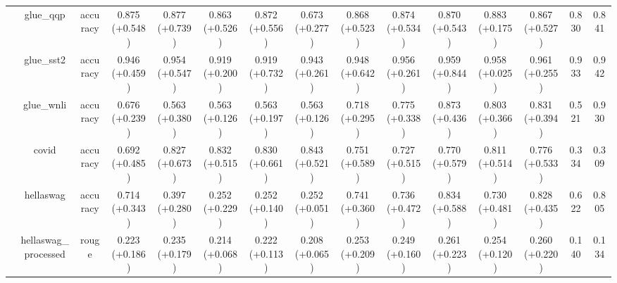 \begin{landscape}
\begin{table}[ht]
{\begin{tabular}{ccccccccccccccc}
                                   & glue\_qqp                      & accuracy                         & 0.875 (+0.548)     & 0.877 (+0.739)    & 0.863 (+0.526)             & 0.872 (+0.556)    & 0.673 (+0.277)             & 0.868 (+0.523)      & 0.874 (+0.534)           & 0.870 (+0.543)      & 0.883 (+0.175)               & 0.867 (+0.527)          & 0.830                  & 0.841          \\
                                   & glue\_sst2                     & accuracy                         & 0.946 (+0.459)     & 0.954 (+0.547)    & 0.919 (+0.200)             & 0.919 (+0.732)    & 0.943 (+0.261)             & 0.948 (+0.642)      & 0.956 (+0.261)           & 0.959 (+0.844)      & 0.958 (+0.025)               & 0.961 (+0.255)          & 0.933                  & 0.942          \\
                                   & glue\_wnli                     & accuracy                         & 0.676 (+0.239)     & 0.563 (+0.380)    & 0.563 (+0.126)             & 0.563 (+0.197)    & 0.563 (+0.126)             & 0.718 (+0.295)      & 0.775 (+0.338)           & 0.873 (+0.436)      & 0.803 (+0.366)               & 0.831 (+0.394)          & 0.521                  & 0.930          \\
                                   & covid                          & accuracy                         & 0.692 (+0.485)     & 0.827 (+0.673)    & 0.832 (+0.515)             & 0.830 (+0.661)    & 0.843 (+0.521)             & 0.751 (+0.589)      & 0.727 (+0.515)           & 0.770 (+0.579)      & 0.811 (+0.514)               & 0.776 (+0.533)          & 0.334                  & 0.309          \\
                                   & hellaswag                      & accuracy                         & 0.714 (+0.343)     & 0.397 (+0.280)    & 0.252 (+0.229)             & 0.252 (+0.140)    & 0.252 (+0.051)             & 0.741 (+0.360)      & 0.736 (+0.472)           & 0.834 (+0.588)      & 0.730 (+0.481)               & 0.828 (+0.435)          & 0.622                  & 0.805          \\
                                   & hellaswag\_processed           & rouge                            & 0.223 (+0.186)     & 0.235 (+0.179)    & 0.214 (+0.068)             & 0.222 (+0.113)    & 0.208 (+0.065)             & 0.253 (+0.209)      & 0.249 (+0.160)           & 0.261 (+0.223)      & 0.254 (+0.120)               & 0.260 (+0.220)          & 0.140                  & 0.134          \\

\end{tabular}}
\end{table}
\end{landscape}
